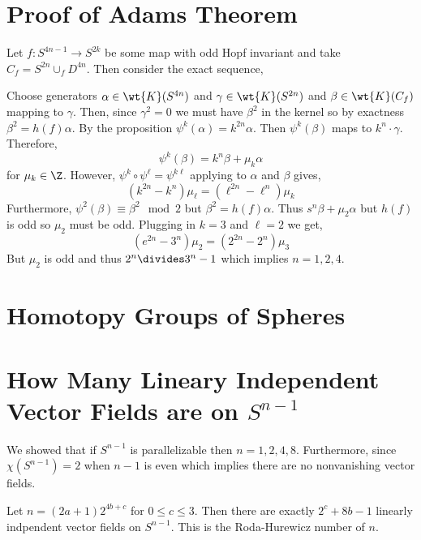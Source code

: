 \documentclass[12pt]{extarticle}
\begin{document}
\section{Proof of Adams Theorem}

Let $f : S^{4n - 1} \to S^{2k}$ be some map with odd Hopf invariant and take $C_f = S^{2n} \cup_f D^{4n}$. Then consider the exact sequence,
\begin{center}
\end{center}
Choose generators $\alpha \in \wt{K}(S^{4n})$ and $\gamma \in \wt{K}(S^{2n})$ and $\beta \in \wt{K}(C_f)$ mapping to $\gamma$. Then, since $\gamma^2 = 0$ we must have $\beta^2$ in the kernel so by exactness $\beta^2 = h(f) \alpha$. By the proposition $\psi^{k}(\alpha) = k^{2n} \alpha$. Then $\psi^k(\beta)$ maps to $k^n \cdot \gamma$. Therefore,
\[ \psi^k(\beta) = k^n \beta  + \mu_k \alpha \]
for $\mu_k \in \Z$. However, $\psi^k \circ \psi^\ell = \psi^{k\ell}$ applying to $\alpha$ and $\beta$ gives,
\[ (k^{2n} - k^n) \mu_\ell = (\ell^{2n} - \ell^n) \mu_k \]
Furthermore, $\psi^2(\beta) \equiv \beta^2 \mod{2}$ but $\beta^2 = h(f) \alpha$. Thus $s^n \beta + \mu_2 \alpha$ but $h(f)$ is odd so $\mu_2$ must be odd. Plugging in $k = 3$ and $\ell = 2$ we get,
\[ (e^{2n} - 3^n) \mu_2 = (2^{2n} - 2^n) \mu_3 \]
But $\mu_2$ is odd and thus $2^n \divides 3^n - 1$ which implies $n = 1,2,4$. 

\begin{prop}

\end{prop}

\section{Homotopy Groups of Spheres}



\section{How Many Lineary Independent Vector Fields are on $S^{n-1}$}

We showed that if $S^{n-1}$ is parallelizable then $n = 1,2,4,8$. Furthermore, since $\chi(S^{n-1}) = 2$ when $n-1$ is even which implies there are no nonvanishing vector fields.

\begin{thm}[Adams]
Let $n = (2a + 1) 2^{4b + c}$ for $0 \le c \le 3$. Then there are exactly $2^c + 8b - 1$ linearly indpendent vector fields on $S^{n-1}$. This is the Roda-Hurewicz number of $n$.
\end{thm}
\end{document}
